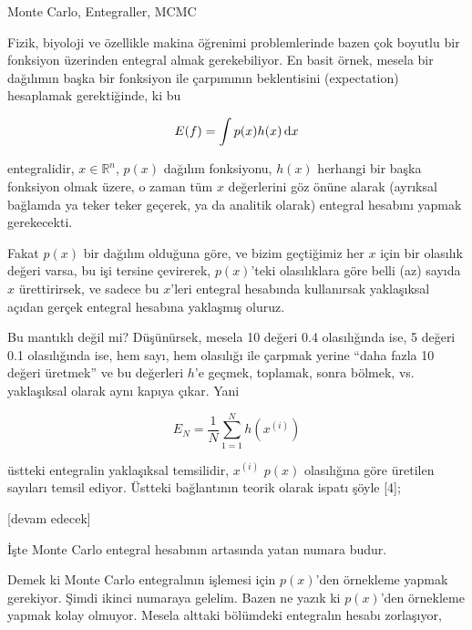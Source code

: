 \documentclass[12pt,fleqn]{article}\usepackage{../../common}
\begin{document}
Monte Carlo, Entegraller, MCMC

Fizik, biyoloji ve özellikle makina öğrenimi problemlerinde bazen çok
boyutlu bir fonksiyon üzerinden entegral almak gerekebiliyor. En basit
örnek, mesela bir dağılımın başka bir fonksiyon ile çarpımının beklentisini
(expectation) hesaplamak gerektiğinde, ki bu

$$ E(f) = \int p(x)h(x) \,\mathrm{d} x $$

entegralidir, $x \in \mathbb{R}^n$, $p(x)$ dağılım fonksiyonu, $h(x)$
herhangi bir başka fonksiyon olmak üzere, o zaman tüm $x$ değerlerini göz
önüne alarak (ayrıksal bağlamda ya teker teker geçerek, ya da analitik
olarak) entegral hesabını yapmak gerekecekti.

Fakat $p(x)$ bir dağılım olduğuna göre, ve bizim geçtiğimiz her $x$ için
bir olasılık değeri varsa, bu işi tersine çevirerek, $p(x)$'teki
olasılıklara göre belli (az) sayıda $x$ ürettirirsek, ve sadece bu $x$'leri
entegral hesabında kullanırsak yaklaşıksal açıdan gerçek entegral hesabına
yaklaşmış oluruz. 

Bu mantıklı değil mi? Düşünürsek, mesela 10 değeri 0.4 olasılığında ise, 5
değeri 0.1 olasılığında ise, hem sayı, hem olasılığı ile çarpmak yerine
``daha fazla 10 değeri üretmek'' ve bu değerleri $h$'e geçmek, toplamak,
sonra bölmek, vs. yaklaşıksal olarak aynı kapıya çıkar. Yani

$$ E_N = \frac{1}{N}\sum_{1=1}^N h(x^{(i)}) $$

üstteki entegralin yaklaşıksal temsilidir, $x^{(i)}$ $p(x)$ olasılığına
göre üretilen sayıları temsil ediyor. Üstteki bağlantının teorik olarak
ispatı şöyle [4];

[devam edecek]


























İşte Monte Carlo entegral hesabının artasında yatan numara budur. 

Demek ki Monte Carlo entegralının işlemesi için $p(x)$'den örnekleme yapmak
gerekiyor. Şimdi ikinci numaraya gelelim.  Bazen ne yazık ki $p(x)$'den
örnekleme yapmak kolay olmuyor. Mesela alttaki bölümdeki entegralın hesabı
zorlaşıyor,
\end{document}
